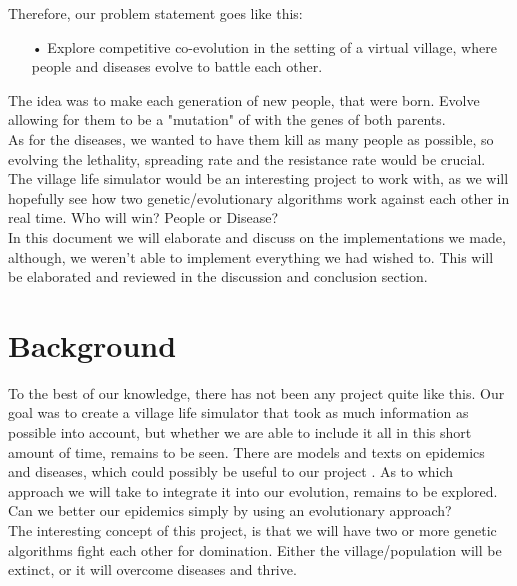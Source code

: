 \documentclass[conference,compsoc]{IEEEtran}
\begin{document}
Therefore, our problem statement goes like this:\\
\begin{itemize}
\item[•]Explore competitive co-evolution in the setting of a virtual village, where people and diseases evolve to battle each other.
\end{itemize}

The idea was to make each generation of new people, that were born. Evolve allowing for them to be a "mutation" of with the genes of both parents.\\
As for the diseases, we wanted to have them kill as many people as possible, so evolving the lethality, spreading rate and the resistance rate would be crucial.\\

The village life simulator would be an interesting project to work with, as we will hopefully see how two genetic/evolutionary algorithms work against each other in real time. Who will win? People or Disease?\\

In this document we will elaborate and discuss on the implementations we made, although, we weren't able to implement everything we had wished to. This will be elaborated and reviewed in the discussion and conclusion section.\\

\section{Background}
To the best of our knowledge, there has not been any project quite like this. Our goal was to create a village life simulator that took as much information as possible into account, but whether we are able to include it all in this short amount of time, remains to be seen. There are models and texts on epidemics and diseases, which could possibly be useful to our project \cite{kermack1927contribution} \cite{jensen2010klinisk}. As to which approach we will take to integrate it into our evolution, remains to be explored. Can we better our epidemics simply by using an evolutionary approach?\\

The interesting concept of this project, is that we will have two or more genetic algorithms fight each other for domination. Either the village/population will be extinct, or it will overcome diseases and thrive.\\
\end{document}
